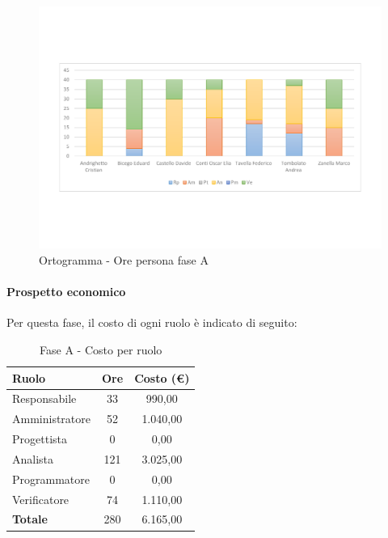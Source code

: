 \documentclass[../PianoProgetto.tex]{subfiles}
\begin{document}
	\begin{figure}[!h]
		\centering
		\includegraphics[width=\textwidth , trim=2cm 5cm 2cm 5cm]{grafici/A/A-ore-persona}
			\caption{Ortogramma - Ore persona fase A}
		\label{fig:BarChart-faseA_ore}
	\end{figure}	
	
\newpage
	\vfill	
	\paragraph{Prospetto economico}
					Per questa fase, il costo di ogni ruolo è indicato di seguito:
	
	\begin{table}[h]
		\centering
		\begin{tabular}{l * {2}{c}}
			\toprule
			\textbf{Ruolo} & \textbf{Ore} & \textbf{Costo (\euro{})} \\
			\midrule
			Responsabile &	33 &  990,00 \\
			Amministratore & 52 &  1.040,00 \\
			Progettista & 0 & 0,00 \\
			Analista & 121 & 3.025,00 \\
			Programmatore & 0 & 0,00 \\
			Verificatore & 74 & 1.110,00 \\
			\midrule		
			\textbf{Totale} & 280 & 6.165,00 \\
			\bottomrule	
		\end{tabular}
		\caption{Fase A - Costo per ruolo}
		\label{tab:faseA_costo}
	\end{table}
\end{document}
